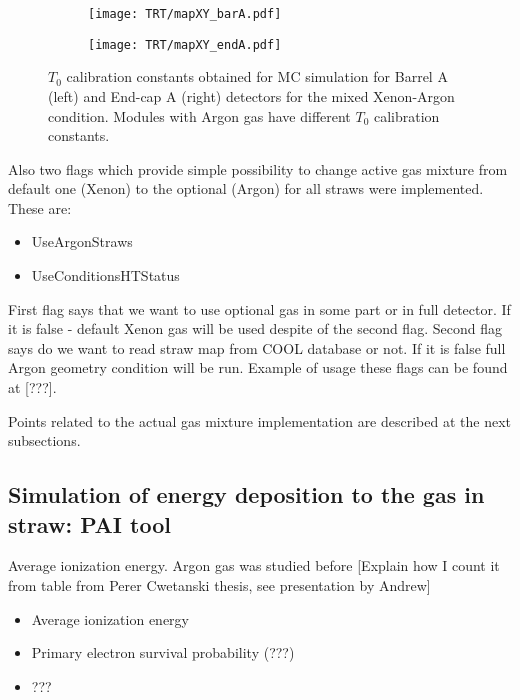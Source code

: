 \begin{figure}

\begin{subfigure}{.5\textwidth}
  \centering
  \texttt{[image: TRT/mapXY\_barA.pdf]}
\end{subfigure}%
\begin{subfigure}{.5\textwidth}
  \centering
  \texttt{[image: TRT/mapXY\_endA.pdf]}
\end{subfigure}

\caption{$T_{0}$ calibration constants obtained for MC simulation for Barrel A (left) and End-cap A (right) detectors for the mixed Xenon-Argon condition. 
	  Modules with Argon gas have different $T_{0}$ calibration constants.}
  \label{fig:t0_mixed_condition}
\end{figure}



Also two flags which provide simple possibility to change active gas mixture from default one (Xenon) to the optional (Argon) for all straws were implemented. These are:
\begin{itemize}
 \item UseArgonStraws
 \item UseConditionsHTStatus
\end{itemize}

First flag says that we want to use optional gas in some part or in full detector. If it is false - default Xenon gas will be used despite of the second flag. 
Second flag says do we want to read straw map from COOL database or not.
If it is false full Argon geometry condition will be run. Example of usage these flags can be found at [???].

Points related to the actual gas mixture implementation are described at the next subsections.

\subsection{Simulation of energy deposition to the gas in straw: PAI tool}


Average ionization energy. Argon gas was studied before   [Explain how I count it from table from Perer Cwetanski thesis, see presentation by Andrew]




\begin{itemize}
 \item Average ionization energy
 \item Primary electron survival probability (???)
 \item ???
\end{itemize}



